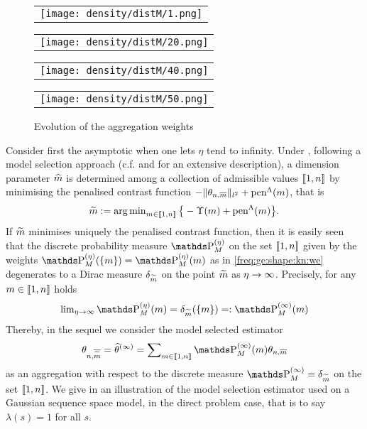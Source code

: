 \begin{figure}
  \centering
  \begin{tabular}{@{}c@{}}
    \texttt{[image: density/distM/1.png]} \\[\abovecaptionskip]
  \end{tabular}
  \begin{tabular}{@{}c@{}}
    \texttt{[image: density/distM/20.png]} \\[\abovecaptionskip]
  \end{tabular}
  
    \begin{tabular}{@{}c@{}}
    \texttt{[image: density/distM/40.png]} \\[\abovecaptionskip]
  \end{tabular}
  \begin{tabular}{@{}c@{}}
    \texttt{[image: density/distM/50.png]} \\[\abovecaptionskip]
  \end{tabular}
  \caption{Evolution of the aggregation weights }
  \label{fig:ge:adaptive:M}
\end{figure}

\medskip

Consider first the asymptotic when one lets $\eta$ tend to infinity.
Under , following a model selection approach (c.f.  and  for an extensive description), a dimension parameter $\hDi$ is determined among a collection of admissible values $\nset{1,\ssY}$ by minimising the penalised contrast function $-\Vnormlp{\txdfPr}+\penSv$, that is
\begin{equation}\label{freq:ge:shape:kn:de:ms}
  \tDi:=\argmin\nolimits_{\Di\in\nset{1,\ssY}} \big\{-\Upsilon(m) + \penSv\big\}.
\end{equation}
If $\tDi$ minimises uniquely the penalised contrast function, then it is easily seen that the discrete probability measure $\rWe[]$ on the set $\nset{1,\ssY}$ given by the weights $\rWe[](\{\Di\})=\rWe$ as in \eqref{freq:ge:shape:kn:we} degenerates to a Dirac measure $\dirac[\tDi]$ on the point $\tDi$ as $\rWc\to\infty$.
Precisely, for any $\Di\in\nset{1,n}$ holds
\begin{equation}\label{freq:ge:shape:kn:de:msWe}
  \lim\nolimits_{\rWc\to\infty}\rWe=\dirac[\tDi](\{\Di\})=:\msWe
\end{equation}
Thereby, in the sequel we consider the model selected estimator
\[\txdfPr[\tDi]=\widehat{\theta}^{(\infty)} =\sum\nolimits_{\Di\in\nset{1,\ssY}}\msWe\txdfPr\]
as an aggregation with respect to the discrete measure $\msWe[]=\dirac[\tDi]$ on the set $\nset{1,\ssY}$.
We give in  an illustration of the model selection estimator used on a Gaussian sequence space model, in the direct problem case, that is to say $\lambda(s) = 1$ for all $s$.

